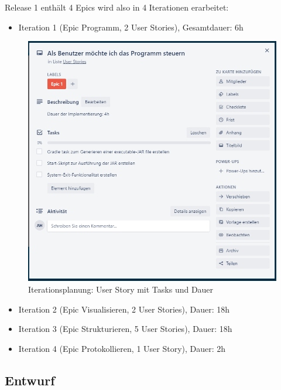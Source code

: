 \documentclass[11pt]{article}
\begin{document}
    Release 1 enthält 4 Epics wird also in 4 Iterationen erarbeitet:
    \begin{itemize}
        \item Iteration 1 (Epic Programm, 2 User Stories), Gesamtdauer: 6h
    \end{itemize}
    \begin{figure}[H]
        \centering
        \includegraphics[width=12cm]{../images/User_Story_1.PNG}
        \caption{Iterationsplanung: User Story mit Tasks und Dauer}
    \end{figure}
    \begin{itemize}
        \item Iteration 2 (Epic Visualisieren, 2 User Stories), Dauer: 18h
        \item Iteration 3 (Epic Strukturieren, 5 User Stories), Dauer: 18h
        \item Iteration 4 (Epic Protokollieren, 1 User Story), Dauer: 2h
    \end{itemize}
    
    \subsection{Entwurf}
\end{document}
